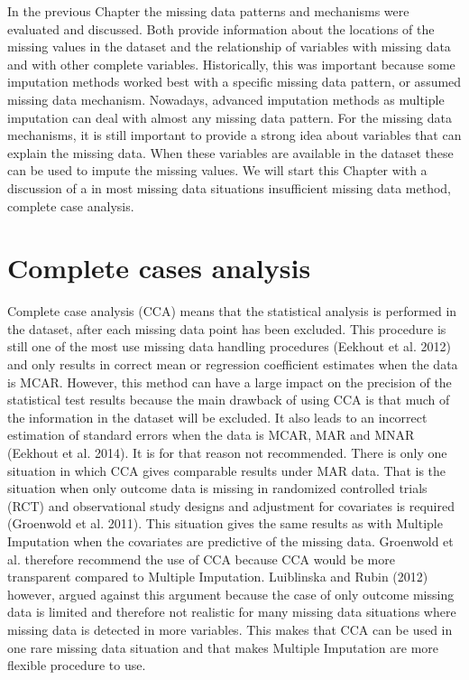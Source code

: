 \documentclass[]{book}
\begin{document}
In the previous Chapter the missing data patterns and mechanisms were
evaluated and discussed. Both provide information about the locations of
the missing values in the dataset and the relationship of variables with
missing data and with other complete variables. Historically, this was
important because some imputation methods worked best with a specific
missing data pattern, or assumed missing data mechanism. Nowadays,
advanced imputation methods as multiple imputation can deal with almost
any missing data pattern. For the missing data mechanisms, it is still
important to provide a strong idea about variables that can explain the
missing data. When these variables are available in the dataset these
can be used to impute the missing values. We will start this Chapter
with a discussion of a in most missing data situations insufficient
missing data method, complete case analysis.

\section{Complete cases analysis}\label{complete-cases-analysis}

Complete case analysis (CCA) means that the statistical analysis is
performed in the dataset, after each missing data point has been
excluded. This procedure is still one of the most use missing data
handling procedures (Eekhout et al. 2012) and only results in correct
mean or regression coefficient estimates when the data is MCAR. However,
this method can have a large impact on the precision of the statistical
test results because the main drawback of using CCA is that much of the
information in the dataset will be excluded. It also leads to an
incorrect estimation of standard errors when the data is MCAR, MAR and
MNAR (Eekhout et al. 2014). It is for that reason not recommended. There
is only one situation in which CCA gives comparable results under MAR
data. That is the situation when only outcome data is missing in
randomized controlled trials (RCT) and observational study designs and
adjustment for covariates is required (Groenwold et al. 2011). This
situation gives the same results as with Multiple Imputation when the
covariates are predictive of the missing data. Groenwold et al.
therefore recommend the use of CCA because CCA would be more transparent
compared to Multiple Imputation. Luiblinska and Rubin (2012) however,
argued against this argument because the case of only outcome missing
data is limited and therefore not realistic for many missing data
situations where missing data is detected in more variables. This makes
that CCA can be used in one rare missing data situation and that makes
Multiple Imputation are more flexible procedure to use.
\end{document}
